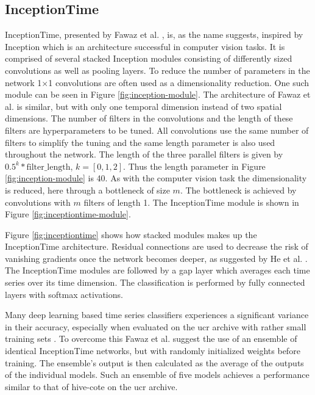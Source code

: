 \subsection{InceptionTime} \label{sec:inception-time}
InceptionTime, presented by Fawaz et al. \cite{IsmailFawaz2020}, is, as the name suggests, inspired by Inception \cite{Szegedy2015} which is an architecture successful in computer vision tasks. It is comprised of several stacked Inception modules consisting of differently sized convolutions as well as pooling layers. To reduce the number of parameters in the network 1$\times$1 convolutions are often used as a dimensionality reduction.
One such module can be seen in Figure \ref{fig:inception-module}. The architecture of Fawaz et al. is similar, but with only one temporal dimension instead of two spatial dimensions. The number of filters in the convolutions and the length of these filters are hyperparameters to be tuned. All convolutions use the same number of filters to simplify the tuning and the same length parameter is also used throughout the network. The length of the three parallel filters is given by $0.5^k* \text{filter\_length}$, $k = [0,1,2]$. Thus the length parameter in Figure \ref{fig:inception-module} is 40. As with the computer vision task the dimensionality is reduced, here through a bottleneck of size $m$. The bottleneck is achieved by convolutions with $m$ filters of length 1. The InceptionTime module is shown in Figure \ref{fig:inceptiontime-module}.

Figure \ref{fig:inceptiontime} shows how stacked modules makes up the InceptionTime architecture. Residual connections are used to decrease the risk of vanishing gradients once the network becomes deeper, as suggested by He et al. \cite{He2016}. The InceptionTime modules are followed by a \gls{gap} layer which averages each time series over its time dimension. The classification is performed by fully connected layers with softmax activations.

Many deep learning based time series classifiers experiences a significant variance in their accuracy, especially when evaluated on the \gls{ucr} archive with rather small training sets \cite{IsmailFawaz2019ensemble}. To overcome this Fawaz et al. suggest the use of an ensemble of identical InceptionTime networks, but with randomly initialized weights before training. The ensemble's output is then calculated as the average of the outputs of the individual models. Such an ensemble of five models achieves a performance similar to that of \gls{hive-cote} on the \gls{ucr} archive.

